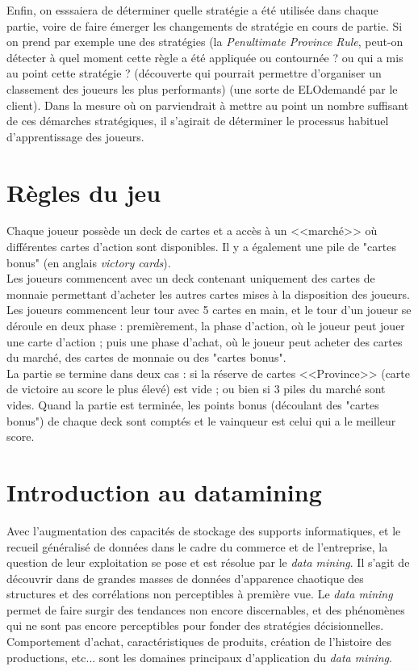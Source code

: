 Enfin, on esssaiera de déterminer quelle stratégie a été utilisée dans chaque partie, voire de faire émerger les changements de stratégie en cours de partie. Si on prend par exemple une des stratégies (la \textit{Penultimate Province Rule}, peut-on détecter à quel moment cette règle a été appliquée ou contournée ? ou qui a mis au point cette stratégie ? (découverte qui pourrait permettre d'organiser un classement des joueurs les plus performants) (une sorte de ELO\footnotemark demandé par le client). Dans la mesure où on parviendrait à mettre au point un nombre suffisant de ces démarches stratégiques, il s'agirait de déterminer le processus habituel d'apprentissage des joueurs.


\section{Règles du jeu}
Chaque joueur possède un deck de cartes et a accès à un <<marché>> où différentes cartes d'action sont disponibles. Il y a également une pile de "cartes bonus" (en anglais \textit{victory cards}).\\

Les joueurs commencent avec un deck contenant uniquement des cartes de monnaie permettant d'acheter les autres cartes mises à la disposition des joueurs. Les joueurs commencent leur tour avec 5 cartes en main, et le tour d'un joueur se déroule en deux phase : premièrement, la phase d'action, où le joueur peut jouer une carte d'action ; puis une phase d'achat, où le joueur peut acheter des cartes du marché, des cartes de monnaie ou des "cartes bonus".\\

La partie se termine dans deux cas : si la réserve de cartes <<Province>> (carte de victoire au score le plus élevé) est vide ; ou bien si 3 piles du marché sont vides. Quand la partie est terminée, les points bonus (découlant des "cartes bonus") de chaque deck sont comptés et le vainqueur est celui qui a le meilleur score.

\section{Introduction au datamining}
Avec l'augmentation des capacités de stockage des supports informatiques, et le recueil généralisé de données dans le cadre du commerce et de l'entreprise, la question de leur exploitation se pose et est résolue par le \textit{data mining}.
Il s'agit de découvrir dans de grandes masses de données d'apparence chaotique des structures et des corrélations non perceptibles à première vue. Le \textit{data mining} permet de faire surgir des tendances non encore discernables, et des phénomènes qui ne sont pas encore perceptibles pour fonder des stratégies décisionnelles. Comportement d'achat, caractéristiques de produits, création de l'histoire des productions, etc... sont les domaines principaux d'application du \textit{data mining}.


